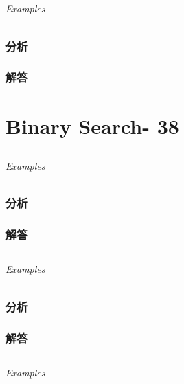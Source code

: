 \documentclass[UTF8,a4paper,12pt]{ctexbook}
\begin{document}
\section{}
	
	\subparagraph{Examples}
	
	\subsection{分析}
	
	\subsection{解答}
\chapter{Binary Search- 38}

\section{}
	
	\subparagraph{Examples}
	
	\subsection{分析}
	
	\subsection{解答}
	
\section{}
	
	\subparagraph{Examples}
	
	\subsection{分析}
	
	\subsection{解答}
	
\section{}
	
	\subparagraph{Examples}
	
\end{document}
